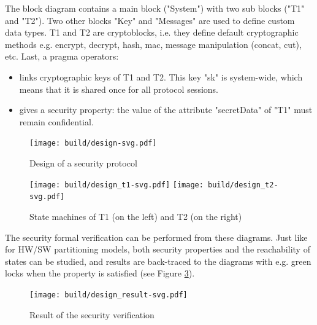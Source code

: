 \documentclass[12pt]{article}
\begin{document}
The block diagram contains a main block ("System") with two sub blocks ("T1" and "T2"). Two other blocks "Key" and "Messages" are used to define custom data types. T1 and T2 are cryptoblocks, i.e. they define default cryptographic methods e.g. encrypt, decrypt, hash, mac, message manipulation (concat, cut), etc. Last, a pragma operators:
\begin{itemize}
\item links cryptographic keys of T1 and T2. This key "sk" is system-wide, which means that it is shared once for all protocol sessions.
\item gives a security property: the value of the attribute "secretData" of "T1" must remain confidential. 
\end{itemize}


\begin{figure}[htbp]
\centering
\texttt{[image: build/design-svg.pdf]}
\caption{Design of a security protocol} \label{fig:design}
\end{figure}

\begin{figure}[htbp]
\centering
\texttt{[image: build/design\_t1-svg.pdf]}\hspace{3cm}
\texttt{[image: build/design\_t2-svg.pdf]}
\caption{State machines of T1 (on the left) and T2 (on the right)} \label{fig:design_t}
\end{figure}

The security formal verification can be performed from these diagrams. Just like for HW/SW partitioning models, both security properties and the reachability of states can be studied, and results are back-traced to the diagrams with e.g. green locks when the property is satisfied (see Figure \ref{fig:design_result}).

\begin{figure}[htbp]
\centering
\texttt{[image: build/design\_result-svg.pdf]}
\caption{Result of the security verification} \label{fig:design_result}
\end{figure}
\end{document}
